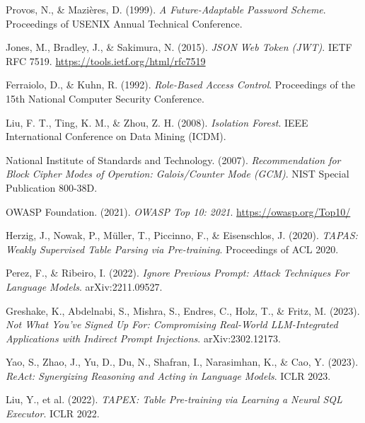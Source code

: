 \documentclass[12pt,a4paper]{report}
\begin{document}
\begin{enumerate}[leftmargin=2em, label={[\arabic*]}]

    \item Provos, N., \& Mazières, D. (1999). \textit{A Future-Adaptable Password Scheme}. Proceedings of USENIX Annual Technical Conference.

    \item Jones, M., Bradley, J., \& Sakimura, N. (2015). \textit{JSON Web Token (JWT)}. IETF RFC 7519. \url{https://tools.ietf.org/html/rfc7519}

    \item Ferraiolo, D., \& Kuhn, R. (1992). \textit{Role-Based Access Control}. Proceedings of the 15th National Computer Security Conference.

    \item Liu, F. T., Ting, K. M., \& Zhou, Z. H. (2008). \textit{Isolation Forest}. IEEE International Conference on Data Mining (ICDM).

    \item National Institute of Standards and Technology. (2007). \textit{Recommendation for Block Cipher Modes of Operation: Galois/Counter Mode (GCM)}. NIST Special Publication 800-38D.

    \item OWASP Foundation. (2021). \textit{OWASP Top 10: 2021}. \url{https://owasp.org/Top10/}

    \item Herzig, J., Nowak, P., Müller, T., Piccinno, F., \& Eisenschlos, J. (2020). \textit{TAPAS: Weakly Supervised Table Parsing via Pre-training}. Proceedings of ACL 2020.

    \item Perez, F., \& Ribeiro, I. (2022). \textit{Ignore Previous Prompt: Attack Techniques For Language Models}. arXiv:2211.09527.

    \item Greshake, K., Abdelnabi, S., Mishra, S., Endres, C., Holz, T., \& Fritz, M. (2023). \textit{Not What You've Signed Up For: Compromising Real-World LLM-Integrated Applications with Indirect Prompt Injections}. arXiv:2302.12173.

    \item Yao, S., Zhao, J., Yu, D., Du, N., Shafran, I., Narasimhan, K., \& Cao, Y. (2023). \textit{ReAct: Synergizing Reasoning and Acting in Language Models}. ICLR 2023.

    \item Liu, Y., et al. (2022). \textit{TAPEX: Table Pre-training via Learning a Neural SQL Executor}. ICLR 2022.


\end{enumerate}
\end{document}
